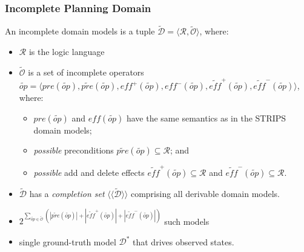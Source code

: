 \documentclass{beamer}
\begin{document}
\newcommand{\incp}[1]{\widetilde{\mathcal{#1}}}
\newcommand{\inc}[1]{\widetilde{#1}}
\newcommand{\pred}[1]{\texttt{\selectfont{#1}}}
\renewcommand{\lbrace}{[}
\renewcommand{\rbrace}{]}

\begin{frame}[c]\frametitle{Incomplete Planning Domain}
\begin{definition}\label{def:planningIncompleteDomains}
An incomplete domain models is a tuple $\widetilde{\mathcal{D}} = \langle \mathcal{R}, \widetilde{\mathcal{O}} \rangle$, where:
\begin{itemize}
	\item $\mathcal{R}$ is the logic language
	\item $\widetilde{\mathcal{O}}$ is a set of incomplete operators $\inc{op} = \langle \mathit{pre}(\inc{op}), \widetilde{\mathit{pre}}(\inc{op}), \mathit{eff}^{+}(\inc{op}), \mathit{eff}^{-}(\inc{op}), \widetilde{\mathit{eff}}^{+}(\inc{op}), \widetilde{\mathit{eff}}^{-}(\inc{op}) \rangle$, where:
	\begin{itemize}
		\item $\mathit{pre}(\inc{op})$ and $\mathit{eff}(\inc{op})$ have the same semantics as in the STRIPS domain models;
		\item \textit{possible} preconditions $\widetilde{\mathit{pre}}(\inc{op}) \subseteq \mathcal{R}$; and
		\item \textit{possible} add and delete effects $\widetilde{\mathit{eff}}^{+}(\inc{op}) \subseteq \mathcal{R}$ and $\widetilde{\mathit{eff}}^{-}(\inc{op}) \subseteq \mathcal{R}$.
	\end{itemize}
\end{itemize}
\end{definition}
\begin{itemize}
	\item $\widetilde{\mathcal{D}}$ has a \textit{completion set} $\langle\langle \widetilde{\mathcal{D}} \rangle\rangle$ comprising all derivable domain models.
	\item $2^{\sum_{\inc{op} \in \widetilde{\mathcal{O}}}(|\widetilde{\mathit{pre}}(\inc{op})| + |\widetilde{\mathit{eff}}^{+}(\inc{op})| + |\widetilde{\mathit{eff}}^{-}(\inc{op})|)}$  such models
	\item single ground-truth model $\mathcal{D}^{*}$ that drives observed states. 
\end{itemize}
\end{frame}
\end{document}
